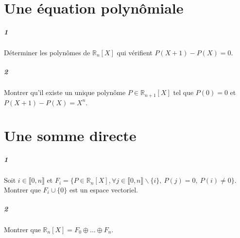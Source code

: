 \documentclass[10pt,a4paper]{article}
\begin{document}
\section{Une équation polynômiale}
\subparagraph{1}Déterminer les polynômes de $\mathbb{R}_n[X]$ qui vérifient $P(X+1)-P(X)=0$.
\subparagraph{2}Montrer qu'il existe un unique polynôme $P\in \mathbb{R}_{n+1}[X]$ tel que $P(0)=0$ et $P(X+1)-P(X)=X^n$.

\section{Une somme directe}
\subparagraph{1}Soit $i \in \llbracket 0,n \rrbracket$ et  $F_i=\lbrace P \in \mathbb{R}_n[X], \forall j \in \llbracket 0,n \rrbracket \backslash \lbrace i \rbrace, \ P(j)=0, \ P(i) \neq 0 \rbrace$. Montrer que $F_i \cup \lbrace 0 \rbrace$ est un espace vectoriel.
\subparagraph{2}Montrer que $\mathbb{R}_n[X]=F_0 \oplus \dots \oplus F_n$.
\end{document}
